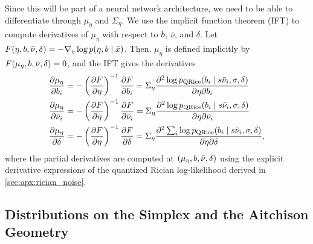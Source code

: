 Since this will be part of a neural network architecture, we need to be able to differentiate through $\mu_{\eta}$ and $\Sigma_{\eta}$.
We use the implicit function theorem (\gls*{IFT}) to compute derivatives of $\mu_{\eta}$ with respect to $b$, $\bar{\nu}$, and $\delta$.
Let $F(\eta, b, \bar{\nu}, \delta) = -\nabla_{\eta} \log p(\eta, b \mid \bar{x})$.
Then, $\mu_{\eta}$ is defined implicitly by $F(\mu_{\eta}, b, \bar{\nu}, \delta) = 0$, and the \gls*{IFT} gives the derivatives
\begin{align}
    \begin{aligned}
        \frac{\partial \mu_{\eta}}{\partial b_{i}}   & = - \left( \frac{\partial F}{\partial \eta} \right)^{-1} \frac{\partial F}{\partial b_{i}} = \Sigma_{\eta} \frac{\partial^2 \log p_{\operatorname{QRice}}(b_{i} \mid s \bar{\nu}_{i}, \sigma, \delta)}{\partial \eta \partial b_{i}}     \\
        \frac{\partial \mu_{\eta}}{\partial \bar{\nu}_{i}} & = - \left( \frac{\partial F}{\partial \eta} \right)^{-1} \frac{\partial F}{\partial \bar{\nu}_{i}} = \Sigma_{\eta} \frac{\partial^2 \log p_{\operatorname{QRice}}(b_{i} \mid s \bar{\nu}_{i}, \sigma, \delta)}{\partial \eta \partial \bar{\nu}_{i}} \\
        \frac{\partial \mu_{\eta}}{\partial \delta}        & = - \left( \frac{\partial F}{\partial \eta} \right)^{-1} \frac{\partial F}{\partial \delta} = \Sigma_{\eta} \frac{\partial^2 \sum_{i} \log p_{\operatorname{QRice}}(b_{i} \mid s \bar{\nu}_{i}, \sigma, \delta)}{\partial \eta \partial \delta},
    \end{aligned}\label{eqn:implicit_gradients}
\end{align}
where the partial derivatives are computed at $(\mu_{\eta}, b, \bar{\nu}, \delta)$ using the explicit derivative expressions of the quantized Rician log-likelihood derived in \cref{sec:apx:rician_noise}.

\subsection{Distributions on the Simplex and the Aitchison Geometry}\label{subsec:aitchison_geometry}

